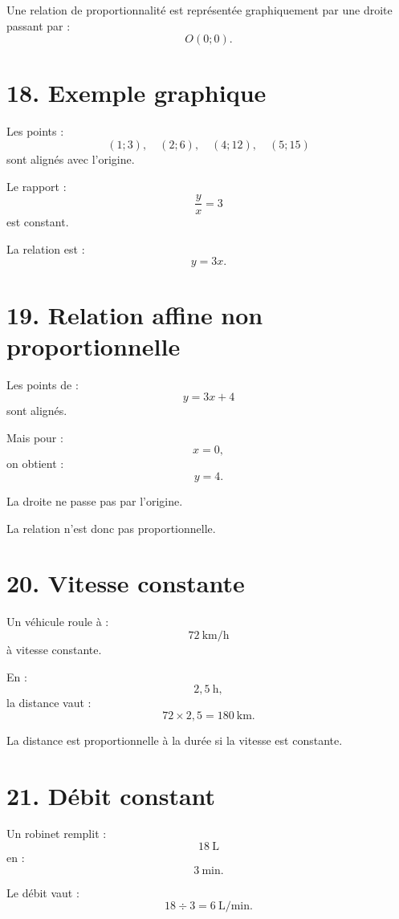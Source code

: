 
\begin{propriete}
Une relation de proportionnalité est représentée graphiquement par une droite passant par :
\[
O(0;0).
\]
\end{propriete}

\section{18. Exemple graphique}

Les points :
\[
(1;3),\quad(2;6),\quad(4;12),\quad(5;15)
\]
sont alignés avec l'origine.

Le rapport :
\[
\dfrac yx=3
\]
est constant.

La relation est :
\[
y=3x.
\]

\section{19. Relation affine non proportionnelle}

Les points de :
\[
y=3x+4
\]
sont alignés.

Mais pour :
\[
x=0,
\]
on obtient :
\[
y=4.
\]

La droite ne passe pas par l'origine.

La relation n'est donc pas proportionnelle.

\section{20. Vitesse constante}

Un véhicule roule à :
\[
72\ \text{km/h}
\]
à vitesse constante.

En :
\[
2{,}5\ \text{h},
\]
la distance vaut :
\[
72\times2{,}5=180\ \text{km}.
\]

La distance est proportionnelle à la durée si la vitesse est constante.

\section{21. Débit constant}

Un robinet remplit :
\[
18\ \text{L}
\]
en :
\[
3\ \text{min}.
\]

Le débit vaut :
\[
18\div3=6\ \text{L/min}.
\]

